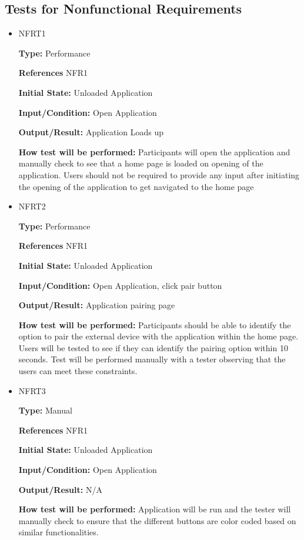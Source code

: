 \documentclass[12pt, titlepage]{article}
\begin{document}
\subsection{Tests for Nonfunctional Requirements}

\begin{itemize}


\item{NFRT1}

\textbf{Type:} Performance

\textbf{References} NFR1
					
\textbf{Initial State:} Unloaded Application
					
\textbf{Input/Condition:} Open Application
					
\textbf{Output/Result:} Application Loads up
					
\textbf{How test will be performed:} Participants will open the application and manually check to see that a home page is loaded on opening of the application. Users should not be required to provide any input after initiating the opening of the application to get navigated to the home page

\item{NFRT2}

\textbf{Type:} Performance

\textbf{References} NFR1
					
\textbf{Initial State:} Unloaded Application
					
\textbf{Input/Condition:} Open Application, click pair button
					
\textbf{Output/Result:} Application pairing page
					
\textbf{How test will be performed:} Participants should be able to identify the option to pair the external device with the application within the home page. Users will be tested to see if they can identify the pairing option within 10 seconds. Test will be performed manually with a tester observing that the users can meet these constraints.

\item{NFRT3}

\textbf{Type:} Manual

\textbf{References} NFR1
					
\textbf{Initial State:} Unloaded Application
					
\textbf{Input/Condition:} Open Application
					
\textbf{Output/Result:} N/A
					
\textbf{How test will be performed:} Application will be run and the tester will manually check to ensure that the different buttons are color coded based on similar functionalities.



\end{itemize}
\end{document}
